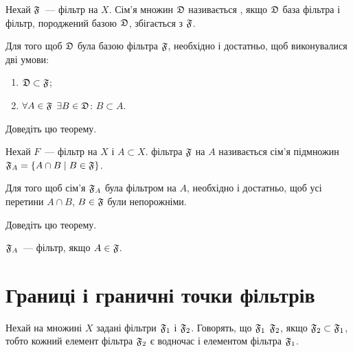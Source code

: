\begin{definition}
    Нехай $\frak F$~--- фільтр на $X$. Сім'я множин $\frak D$ називається , якщо $\frak D$ база фільтра і фільтр, породжений базою $\frak D$, збігається з $\frak F$.
\end{definition}

\begin{theorem}
    Для того щоб $\frak D$ була базою фільтра $\frak F$, необхідно і достатньо, щоб виконувалися дві умови:
    \begin{enumerate}
        \item $\frak D \subset \frak F$;
        \item $\forall A \in \frak F$ $\exists B \in \frak D$: $B \subset A$.
    \end{enumerate}
\end{theorem}

\begin{exercise}
    Доведіть цю теорему.
\end{exercise}

\begin{definition}
    Нехай $F$~--- фільтр на $X$ і $A \subset X$.  фільтра $\frak F$ на $A$ називається сім'я підмножин $\frak F_A = \{ A \cap B \mid B \in \frak F\}$.
\end{definition}

\begin{theorem}
    Для того щоб сім'я $\frak F_A$ була фільтром на $A$, необхідно і достатньо, щоб усі перетини $A \cap B$, $B \in \frak F$ були непорожніми.
\end{theorem}

\begin{exercise}
    Доведіть цю теорему.
\end{exercise}

\begin{corollary}
    $\frak F_A$~--- фільтр, якщо $A \in \frak F$.
\end{corollary}

\section{Границі і граничні точки фільтрів}

\begin{definition}
    Нехай на множині $X$ задані фільтри $\frak F_1$ і $\frak F_2$. Говорять, що $\frak F_1$  $\frak F_2$, якщо $\frak F_2 \subset \frak F_1$, тобто кожний елемент фільтра $\frak F_2$ є водночас і елементом фільтра $\frak F_1$.
\end{definition}

